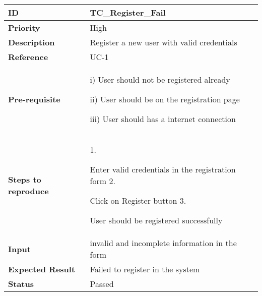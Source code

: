 \begin{center}
    \begin{tabularx}{\textwidth}{|l|X|}
        \hline
        \textbf{ID}                 & TC\_Register\_Fail                             \\
        \hline
        \textbf{Priority}           & High                                           \\
        \hline
        \textbf{Description}        & Register a new user with valid credentials     \\
        \hline
        \textbf{Reference}          & UC-1                                           \\
        \hline
        \textbf{Pre-requisite}      & i) User should not be registered already

        ii) User should be on the registration page

        iii)  User should has a internet connection                                  \\
        \hline
        \textbf{Steps to reproduce} & 1.

        Enter valid credentials in the registration form 2.

        Click on Register button 3.

        User should be registered successfully                                       \\
        \hline
        \textbf{Input}              & invalid and incomplete information in the form \\
        \hline
        \textbf{Expected Result}    & Failed to register in the system               \\
        \hline
        \textbf{Status}             & Passed                                         \\
        \hline
    \end{tabularx}
\end{center}
\newpage


